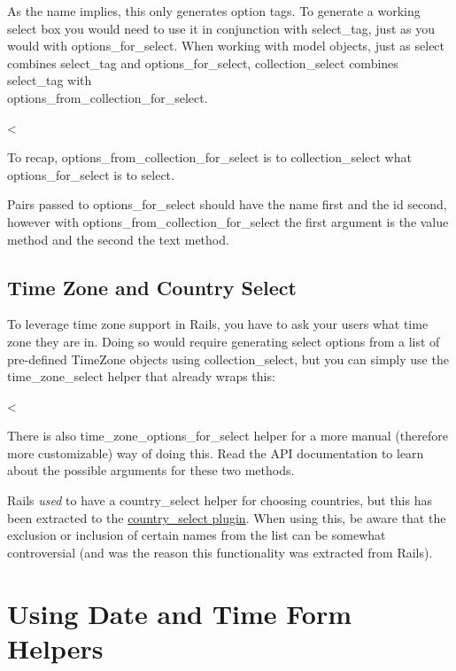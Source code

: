 \documentclass[10pt]{book}
\newenvironment{code}{%
  \scriptsize
    \verbatim
}{%
    \endverbatim
    \newline
}
\begin{document}
As the name implies, this only generates option tags. To generate a  working select box you would need to use it in conjunction with select\_tag, just as you would with options\_for\_select. When working with model objects, just as select combines select\_tag and options\_for\_select, collection\_select combines select\_tag with \\ options\_from\_collection\_for\_select.
\begin{code}
<%
\end{code}

To recap, options\_from\_collection\_for\_select is to collection\_select what options\_for\_select is to select.

Pairs passed to options\_for\_select should have the name first and the id second, however with options\_from\_collection\_for\_select the first argument is the value method and the second the text method.

\subsection{ Time Zone and Country Select}

To leverage time zone support in Rails, you have to ask your users  what time zone they are in. Doing so would require generating select  options from a list of pre-defined TimeZone objects using collection\_select, but you can simply use the time\_zone\_select helper that already wraps this:
\begin{code}
<%
\end{code}

There is also time\_zone\_options\_for\_select helper for a more manual (therefore more customizable) way of doing this. Read the API documentation to learn about the possible arguments for these two methods.

Rails \emph{used} to have a country\_select helper for choosing countries, but this has been extracted to the \href{https://github.com/chrislerum/country_select}{country\_select plugin}.  When using this, be aware that the exclusion or inclusion of certain  names from the list can be somewhat controversial (and was the reason  this functionality was extracted from Rails).

\section{ Using Date and Time Form Helpers}
\end{document}
